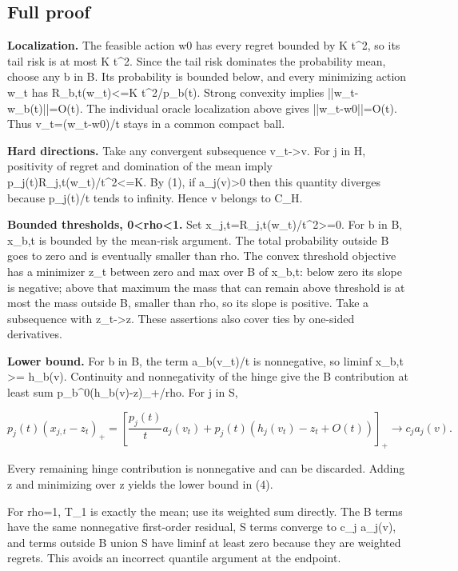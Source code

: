 \documentclass[10pt]{article}
\begin{document}
\subsection*{Full proof}

\textbf{Localization.} The feasible action w0 has every regret bounded by K t\textasciicircum{}2, so its tail risk is at most K t\textasciicircum{}2. Since the tail risk dominates the probability mean, choose any b in B. Its probability is bounded below, and every minimizing action w\_t has R\_b,t(w\_t)<=K t\textasciicircum{}2/p\_b(t). Strong convexity implies ||w\_t-w\_b(t)||=O(t). The individual oracle localization above gives ||w\_t-w0||=O(t). Thus v\_t=(w\_t-w0)/t stays in a common compact ball.

\textbf{Hard directions.} Take any convergent subsequence v\_t->v. For j in H, positivity of regret and domination of the mean imply p\_j(t)R\_j,t(w\_t)/t\textasciicircum{}2<=K. By (1), if a\_j(v)>0 then this quantity diverges because p\_j(t)/t tends to infinity. Hence v belongs to C\_H.

\textbf{Bounded thresholds, 0<rho<1.} Set x\_j,t=R\_j,t(w\_t)/t\textasciicircum{}2>=0. For b in B, x\_b,t is bounded by the mean-risk argument. The total probability outside B goes to zero and is eventually smaller than rho. The convex threshold objective has a minimizer z\_t between zero and max over B of x\_b,t: below zero its slope is negative; above that maximum the mass that can remain above threshold is at most the mass outside B, smaller than rho, so its slope is positive. Take a subsequence with z\_t->z. These assertions also cover ties by one-sided derivatives.

\textbf{Lower bound.} For b in B, the term a\_b(v\_t)/t is nonnegative, so liminf x\_b,t >= h\_b(v). Continuity and nonnegativity of the hinge give the B contribution at least sum p\_b\textasciicircum{}0(h\_b(v)-z)\_+/rho. For j in S,

\[
p_j(t)(x_{j,t}-z_t)_+
=\left[\frac{p_j(t)}t a_j(v_t)+p_j(t)(h_j(v_t)-z_t+O(t))\right]_+
\longrightarrow c_j a_j(v).
\]



Every remaining hinge contribution is nonnegative and can be discarded. Adding z and minimizing over z yields the lower bound in (4).

For rho=1, T\_1 is exactly the mean; use its weighted sum directly. The B terms have the same nonnegative first-order residual, S terms converge to c\_j a\_j(v), and terms outside B union S have liminf at least zero because they are weighted regrets. This avoids an incorrect quantile argument at the endpoint.
\end{document}
